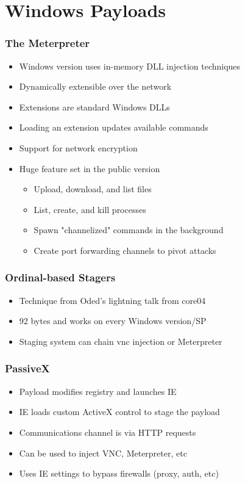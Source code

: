 \documentclass{beamer}
\newenvironment{sitemize}{\vspace{1mm}\begin{itemize}\itemsep 4pt}{\end{itemize}}
\begin{document}
\section{Windows Payloads}

\begin{frame}
	\frametitle{The Meterpreter}
	\begin{sitemize}
		\item Windows version uses in-memory DLL injection techniques
		\item Dynamically extensible over the network
		\item Extensions are standard Windows DLLs
		\item Loading an extension updates available commands
		\item Support for network encryption
		\item Huge feature set in the public version
		\begin{sitemize}
			\item Upload, download, and list files
			\item List, create, and kill processes
			\item Spawn "channelized" commands in the background
			\item Create port forwarding channels to pivot attacks
		\end{sitemize}
	\end{sitemize}	
\end{frame}

\begin{frame}
	\frametitle{Ordinal-based Stagers}
	\begin{sitemize}
		\item Technique from Oded's lightning talk from core04
		\item 92 bytes and works on every Windows version/SP
		\item Staging system can chain vnc injection or Meterpreter
	\end{sitemize}	
\end{frame}

\begin{frame}
	\frametitle{PassiveX}
	\begin{sitemize}
		\item Payload modifies registry and launches IE
		\item IE loads custom ActiveX control to stage the payload
		\item Communications channel is via HTTP requests
		\item Can be used to inject VNC, Meterpreter, etc
		\item Uses IE settings to bypass firewalls (proxy, auth, etc)
	\end{sitemize}	
\end{frame}
\end{document}
